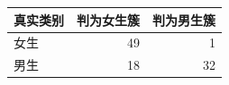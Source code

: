 \begin{tabular}{lrr}
\toprule
真实类别 & 判为女生簇 & 判为男生簇 \\
\midrule
女生 & 49 & 1 \\
男生 & 18 & 32 \\
\bottomrule
\end{tabular}
